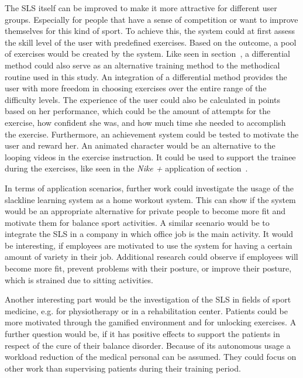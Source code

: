 The SLS itself can be improved to make it more attractive for different user groups.
Especially for people that have a sense of competition or want to improve themselves for this kind of sport. 
To achieve this, the system could at first assess the skill level of the user with predefined exercises.
Based on the outcome, a pool of exercises would be created by the system.
Like seen in section~\textit{}, a differential method could also serve as an alternative training method to the methodical routine used in this study.
An integration of a differential method provides the user with more freedom in choosing exercises over the entire range of the difficulty levels.
The experience of the user could also be calculated in points based on her performance, which could be the amount of attempts for the exercise, how confident she was, and how much time she needed to accomplish the exercise.
Furthermore, an achievement system could be tested to motivate the user and reward her.
An animated character would be an alternative to the looping videos in the exercise instruction.
It could be used to support the trainee during the exercises, like seen in the \textit{Nike +} application of section~\textit{}.

In terms of application scenarios, further work could investigate the usage of the slackline learning system as a home workout system.
This can show if the system would be an appropriate alternative for private people to become more fit and motivate them for balance sport activities.
A similar scenario would be to integrate the SLS in a company in which office job is the main activity.
It would be interesting, if employees are motivated to use the system for having a certain amount of variety in their job.
Additional research could observe if employees will become more fit, prevent problems with their posture, or improve their posture, which is strained due to sitting activities.

Another interesting part would be the investigation of the SLS in fields of sport medicine, e.g. for physiotherapy or in a rehabilitation center.
Patients could be more motivated through the gamified environment and for unlocking exercises.
A further question would be, if it has positive effects to support the patients in respect of the cure of their balance disorder.
Because of its autonomous usage a workload reduction of the medical personal can be assumed.
They could focus on other work than supervising patients during their training period.

